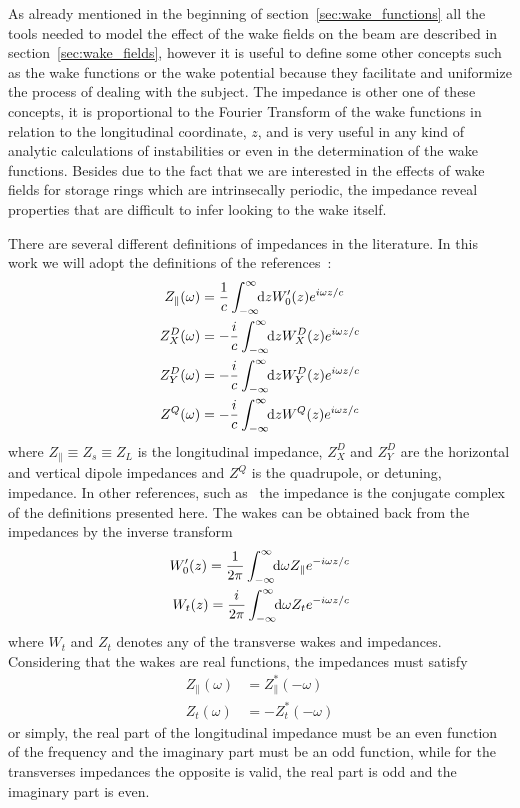 \documentclass[
	12pt,				%
	openright,			%
	oneside,			%
	a4paper,		%
	chapter=TITLE,		%
	section=TITLE,		%
    brazil,				%
	english,			%
	sumario=tradicional,
	]{abntex2}
\begin{document}
  As already mentioned in the beginning of section~\ref{sec:wake_functions} all the tools needed to model the effect of the wake fields on the beam are described in section~\ref{sec:wake_fields}, however it is useful to define some other concepts such as the wake functions or the wake potential because they facilitate and uniformize the process of dealing with the subject. The impedance is other one of these concepts, it is proportional to the Fourier Transform of the wake functions in relation to the longitudinal coordinate, $z$, and is very useful in any kind of analytic calculations of instabilities or even in the determination of the wake functions. Besides due to the fact that we are interested in the effects of wake fields for storage rings which are intrinsecally periodic, the impedance reveal properties that are difficult to infer looking to the wake itself.

  There are several different definitions of impedances in the literature. In this work we will adopt the definitions of the references~\cite{CHao1993, Stupakov2000a, Heifets1991}:
  \begin{align}\label{eq:impedances_definition}
	  \nonumber
  	  Z_\parallel(\omega) &= \frac1c \infint{z}{W'_0(z)e^{i\omega z/c}}\\
  	  \nonumber
      Z^D_X(\omega) &= -\frac{i}{c} \infint{z}{W^D_X(z)e^{i\omega z/c}}\\
      Z^D_Y(\omega) &= -\frac{i}{c} \infint{z}{W^D_Y(z)e^{i\omega z/c}}\\
	  \nonumber
      Z^Q(\omega) &= -\frac{i}{c} \infint{z}{W^Q(z)e^{i\omega z/c}}
  \end{align}
  where $Z_\parallel \equiv Z_s \equiv Z_L$ is the longitudinal impedance, $Z^D_X$ and $Z^D_Y$ are the horizontal and vertical dipole impedances and $Z^Q$ is the quadrupole, or detuning, impedance. In other references, such as~\cite{Zotter1993, Wilson1987} the impedance is the conjugate complex of the definitions presented here. The wakes can be obtained back from the impedances by the inverse transform
  \begin{align}
	  \nonumber
  	  W'_0(z) = \frac{1}{2\pi}\int_{-\infty}^{\infty}\!\!\text{d}\omega Z_\parallel e^{-i\omega z/c}\\
	  W_t(z) = \frac{i}{2\pi}\int_{-\infty}^{\infty}\!\!\text{d}\omega Z_t e^{-i\omega z/c}
  \end{align}
  where $W_t$ and $Z_t$ denotes any of the transverse wakes and impedances. Considering that the wakes are real functions, the impedances must satisfy
  \begin{align}
  	  Z_\parallel(\omega) &= Z_\parallel^*(-\omega)\\
	  Z_t(\omega) &= -Z_t^*(-\omega)
  \end{align}
  or simply, the real part of the longitudinal impedance must be an even function of the frequency and the imaginary part must be an odd function, while for the transverses impedances the opposite is valid, the real part is odd and the imaginary part is even.
\end{document}

